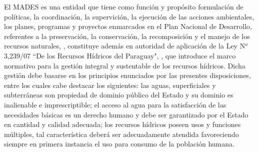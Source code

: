 El MADES es una entidad que tiene como funci\'on y prop\'osito formulaci\'on de pol\'iticas, la coordinaci\'on, la supervici\'on, la ejecuci\'on de las acciones ambientales, los planes, programas y proyectos enmarcados en el Plan Nacional de Desarrollo, referentes a la preservaci\'on, la conservaci\'on, la recomposici\'on y el manejo de los recursos naturales, \cite{mades_antecedentes_nodate}, constituye además  en autoridad de aplicación de la Ley N$^{o}$ 3,239/07 “De los Recursos Hídricos del Paraguay", \cite{noauthor_presidente_nodate}, que introduce el marco normativo para la gestión integral y sustentable de los recursos hídricos. 
Dicha gestión debe basarse en los principios enunciados por las presentes disposiciones, entre los cuales cabe destacar los siguientes: las aguas, superficiales y subterráneas son propiedad de dominio público del Estado y su dominio es inalienable e imprescriptible; el acceso al agua para la satisfacción de las necesidades básicas es un derecho humano y debe ser garantizado por el Estado en cantidad y calidad adecuada; los recursos hídricos poseen usos y funciones múltiples, tal característica deberá ser adecuadamente atendida favoreciendo siempre en primera instancia el uso para consumo de la población humana. 

